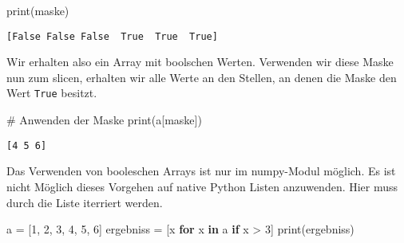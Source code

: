 \documentclass[
  letterpaper,
  DIV=11,
  numbers=noendperiod]{scrreprt}
\newenvironment{Shaded}{\begin{snugshade}}{\end{snugshade}}
\newcommand{\BuiltInTok}[1]{\textcolor[rgb]{0.00,0.23,0.31}{#1}}
\newcommand{\CommentTok}[1]{\textcolor[rgb]{0.37,0.37,0.37}{#1}}
\newcommand{\ControlFlowTok}[1]{\textcolor[rgb]{0.00,0.23,0.31}{\textbf{#1}}}
\newcommand{\DecValTok}[1]{\textcolor[rgb]{0.68,0.00,0.00}{#1}}
\newcommand{\KeywordTok}[1]{\textcolor[rgb]{0.00,0.23,0.31}{\textbf{#1}}}
\newcommand{\NormalTok}[1]{\textcolor[rgb]{0.00,0.23,0.31}{#1}}
\newcommand{\OperatorTok}[1]{\textcolor[rgb]{0.37,0.37,0.37}{#1}}
\begin{document}
\begin{tcolorbox}
\begin{Shaded}
\begin{Highlighting}[]
\BuiltInTok{print}\NormalTok{(maske)}
\end{Highlighting}
\end{Shaded}

\begin{verbatim}
[False False False  True  True  True]
\end{verbatim}

Wir erhalten also ein Array mit boolschen Werten. Verwenden wir diese
Maske nun zum slicen, erhalten wir alle Werte an den Stellen, an denen
die Maske den Wert \texttt{True} besitzt.

\begin{Shaded}
\begin{Highlighting}[]
\CommentTok{\# Anwenden der Maske}
\BuiltInTok{print}\NormalTok{(a[maske])}
\end{Highlighting}
\end{Shaded}

\begin{verbatim}
[4 5 6]
\end{verbatim}

\begin{tcolorbox}[enhanced jigsaw, breakable, opacityback=0, left=2mm, coltitle=black, leftrule=.75mm, colframe=quarto-callout-warning-color-frame, opacitybacktitle=0.6, toprule=.15mm, bottomtitle=1mm, titlerule=0mm, toptitle=1mm, title=\textcolor{quarto-callout-warning-color}{\faExclamationTriangle}\hspace{0.5em}{Warning}, colbacktitle=quarto-callout-warning-color!10!white, arc=.35mm, bottomrule=.15mm, rightrule=.15mm, colback=white]

Das Verwenden von booleschen Arrays ist nur im numpy-Modul möglich. Es
ist nicht Möglich dieses Vorgehen auf native Python Listen anzuwenden.
Hier muss durch die Liste iterriert werden.

\begin{Shaded}
\begin{Highlighting}[]
\NormalTok{a }\OperatorTok{=}\NormalTok{ [}\DecValTok{1}\NormalTok{, }\DecValTok{2}\NormalTok{, }\DecValTok{3}\NormalTok{, }\DecValTok{4}\NormalTok{, }\DecValTok{5}\NormalTok{, }\DecValTok{6}\NormalTok{]}
\NormalTok{ergebniss }\OperatorTok{=}\NormalTok{ [x }\ControlFlowTok{for}\NormalTok{ x }\KeywordTok{in}\NormalTok{ a }\ControlFlowTok{if}\NormalTok{ x }\OperatorTok{\textgreater{}} \DecValTok{3}\NormalTok{]}
\BuiltInTok{print}\NormalTok{(ergebniss) }
\end{Highlighting}
\end{Shaded}


\end{tcolorbox}
\end{tcolorbox}
\end{document}
